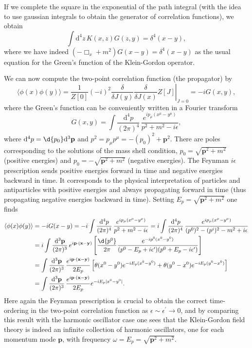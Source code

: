 If we complete the square in the exponential of the path integral (with the idea to use gaussian integrals to obtain the generator of correlation functions), we obtain
\[
    \int \mathrm{d}^4 z \, K(x,z) G(z,y) = \delta^4(x-y),
\]
where we have indeed \(\left(-\Box_x + m^2 \right) G(x-y) = \delta^4(x-y)\) as the usual equation for the Green's function of the Klein-Gordon operator.

We can now compute the two-point correlation function (the propagator) by
\[
    \langle \phi(x) \phi(y) \rangle = \left. \frac{1}{Z[0]} \left(-i\right)^2 \frac{\delta}{\delta J(y)} \frac{\delta}{\delta J(x)} Z[J] \right|_{J=0} = -i G(x,y),
\]
where the Green's function can be conveniently written in a Fourier transform
\[
    G(x,y) = \int \frac{\mathrm{d}^4 p}{(2\pi)^4} \, \frac{e^{ip_\mu (x^{\mu} - y^{\mu})}}{p^2 + m^2 - i \epsilon},
\]
where \(\mathrm{d}^4 p = \d{p_0}\mathrm{d}^3 \mathbf{p}\) and \(p^2 = p_\mu p^{\mu} = -(p_0)^2 + \mathbf{p}^2\). There are poles corresponding to the solutions of the mass shell condition, \(p_0 = \sqrt{\mathbf{p}^2 + m^2}\) (positive energies) and \(p_0 = -\sqrt{\mathbf{p}^2 + m^2}\) (negative energies). The Feynman \(i \epsilon\) prescription sends positive energies forward in time and negative energies backward in time. It corresponds to the physical interpretation of particles and antiparticles with positive energies and always propagating forward in time (thus propagating negative energies backward in time). Setting \(E_p = \sqrt{\mathbf{p}^2 + m^2}\) one finds
\[
    \begin{aligned}
        \langle \phi(x) \phi(y) \rangle & = -i G(x-y) = -i \int \frac{\mathrm{d}^4 p}{(2\pi)^4} \, \frac{e^{ip_\mu (x^{\mu} - y^{\mu})}}{p^2 + m^2 - i \epsilon} =  i \int \frac{\mathrm{d}^4 p}{(2\pi)^4} \, \frac{e^{ip_\mu (x^{\mu} - y^{\mu})}}{(p^0)^2 - (p^i)^2 - m^2 + i \epsilon} \\
                                        & = i \int \frac{\mathrm{d}^3 \mathbf{p}}{(2\pi)^3} \, e^{i \mathbf{p} \cdot (\mathbf{x} - \mathbf{y})}\left[ \frac{\d{p^0}}{2\pi} \frac{e^{-ip^0 (x^0 - y^0)}}{(p^0 - E_p + i\epsilon^{\prime} )(p^0 + E_p - i\epsilon^{\prime})} \right]        \\
                                        & = \int \frac{\mathrm{d}^3 \mathbf{p}}{(2\pi)^3} \, \frac{e^{i \mathbf{p} \cdot (\mathbf{x} - \mathbf{y})}}{2 E_p} \left[ \theta(x^0 - y^0) e^{-i E_p (x^0 - y^0)} + \theta(y^0 - x^0) e^{-i E_p (y^0 - x^0)} \right]                            \\
                                        & = \int \frac{\mathrm{d}^3 \mathbf{p}}{(2\pi)^3} \, \frac{e^{i \mathbf{p} \cdot (\mathbf{x} - \mathbf{y})}}{2 E_p} e^{-i E_p \vert x^0 - y^0 \vert}.
    \end{aligned}
\]
Here again the Feynman prescription is crucial to obtain the correct time-ordering in the two-point correlation function as \(\epsilon \sim \epsilon^{\prime} \to 0\), and by comparing this result with the harmonic oscillator case one sees that the Klein-Gordon field theory is indeed an infinite collection of harmonic oscillators, one for each momentum mode \(\mathbf{p}\), with frequency \(\omega = E_p = \sqrt{\mathbf{p}^2 + m^2}\).

